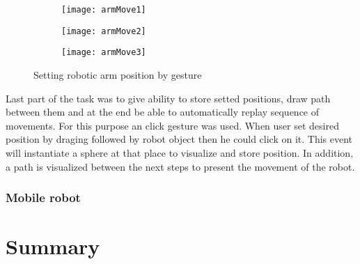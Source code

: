 \documentclass[printmode,en]{mgr}
\begin{document}
\begin{figure}[!ht]
\centering
\begin{subfigure}{.33\textwidth}
  \centering
  \texttt{[image: armMove1]}
\end{subfigure}%
\begin{subfigure}{.33\textwidth}
  \centering
  \texttt{[image: armMove2]}
\end{subfigure}
\begin{subfigure}{.33\textwidth}
  \centering
  \texttt{[image: armMove3]}
\end{subfigure}%
\caption{Setting robotic arm position by gesture}
\label{fig:armMove}
\end{figure}

Last part of the task was to give ability to store setted positions, draw path between them and at the end be able to automatically replay sequence of movements. For this purpose an click gesture was used. When user set desired position by draging followed by robot object then he could click on it. This event will instantiate a sphere at that place to visualize and store position. In addition, a path is visualized between the next steps to present the movement of the robot.

\subsection{Mobile robot}


\chapter{Summary}
\appendix




\end{document}
